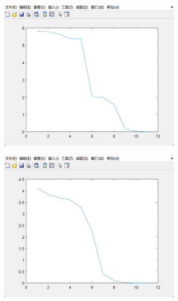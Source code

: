 \documentclass[11pt]{ctexart}
\begin{document}
	\begin{figure}[H]
		\centering
		\begin{subfigure}[t]{0.3\textwidth}
			\centering
			\includegraphics[width=\textwidth]{./picture/exp1_3_1}
			\caption{}
			\label{fig:a}
		\end{subfigure}
		\begin{subfigure}[t]{0.3\textwidth}
			\centering
			\includegraphics[width=\textwidth]{./picture/exp1_3_2}
			\caption{}
			\label{fig:b}
		\end{subfigure}

\end{figure}
\end{document}
